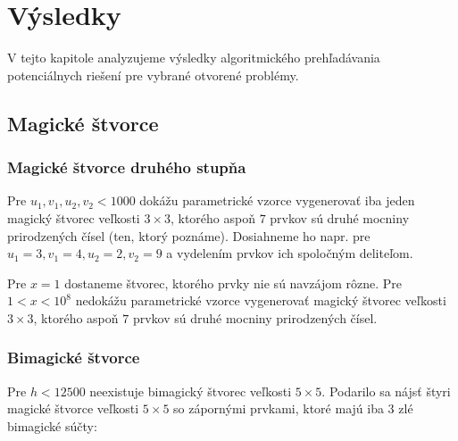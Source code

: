 \chapter{Výsledky}

\label{kap:results} %

V tejto kapitole analyzujeme výsledky algoritmického prehľadávania potenciálnych riešení pre vybrané otvorené problémy. \\

\section{Magické štvorce}

\subsection{Magické štvorce druhého stupňa}

\begin{subresult} Pre $u_1, v_1, u_2, v_2 < 1000$ dokážu parametrické vzorce vygenerovať iba jeden magický štvorec veľkosti $3 \times 3$, ktorého aspoň $7$ prvkov sú druhé mocniny prirodzených čísel (ten, ktorý poznáme). Dosiahneme ho napr. pre $u_1 = 3, v_1 = 4, u_2 = 2, v_2 = 9$ a vydelením prvkov ich spoločným deliteľom.
\end{subresult}

\begin{subresult} Pre $x = 1$ dostaneme štvorec, ktorého prvky nie sú navzájom rôzne. Pre $1 < x < 10^8$ nedokážu parametrické vzorce vygenerovať magický štvorec veľkosti $3 \times 3$, ktorého aspoň $7$ prvkov sú druhé mocniny prirodzených čísel.
\end{subresult}

\subsection{Bimagické štvorce}

\begin{subresult} Pre $h < 12500$ neexistuje bimagický štvorec veľkosti $5 \times 5$. Podarilo sa nájsť štyri magické štvorce veľkosti $5 \times 5$ so zápornými prvkami, ktoré majú iba $3$ zlé bimagické súčty:
\end{subresult}

